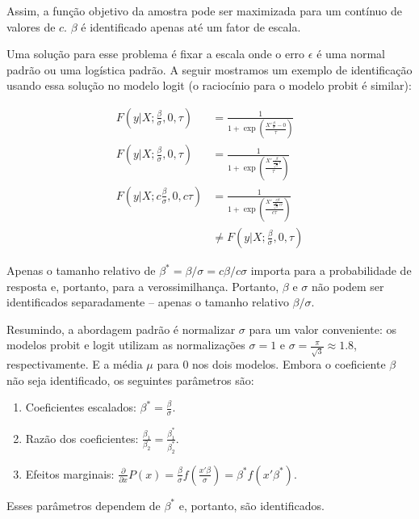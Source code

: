 \documentclass[12pt, a4paper, openany]{book}
\numberwithin{equation}{chapter}
\numberwithin{table}{chapter}
\numberwithin{figure}{chapter}
\theoremstyle{break}
\begin{document}
Assim, a função objetivo da amostra pode ser maximizada para um contínuo de valores de \( c \).
 \( \beta \) é identificado apenas até um fator de escala. 
 
 
Uma solução para esse problema é fixar a escala onde o erro $\epsilon$ é uma normal padrão ou uma logística padrão. A seguir mostramos um exemplo de identificação usando essa solução no modelo logit (o raciocínio para o modelo probit é similar):


\begin{align*}
    F(y | X; \frac{\beta}{\sigma},0,\tau )  &=  \frac{1}{1 + \exp\left( \frac{ X'\frac{\beta}{\sigma} - 0}{\tau} \right)} \\
    F(y | X; \frac{\beta}{\sigma},0,\tau )  &=  \frac{1}{1 + \exp\left( \frac{ X'\frac{\beta}{\frac{\pi}{\sqrt{3}}\tau}}{\tau} \right)} \\
    F(y | X; c \frac{\beta}{\sigma},0,c\tau ) & =  \frac{1}{1 + \exp\left( \frac{ X'\frac{c\beta}{\frac{\pi}{\sqrt{3}}c\tau}}{c\tau} \right)} \\
    & \neq F(y | X; \frac{\beta}{\sigma},0,\tau )
\end{align*}



Apenas o tamanho relativo de  $\beta^* = \beta / \sigma = c\beta / c\sigma$  importa para a probabilidade de resposta e, portanto, para a verossimilhança. Portanto, \( \beta \) e \( \sigma \) não podem ser identificados separadamente – apenas o tamanho relativo \( \beta / \sigma \). 



Resumindo, a abordagem padrão é normalizar $\sigma$ para um valor conveniente: os modelos probit e logit utilizam as normalizações $\sigma = 1$ e $\sigma = \frac{\pi}{\sqrt{3}} \approx 1.8$, respectivamente. E a média $\mu$ para 0 nos dois modelos. Embora o coeficiente $\beta$ não seja identificado, os seguintes parâmetros são:

\begin{enumerate}
    \item Coeficientes escalados: $\beta^* = \frac{\beta}{\sigma}$.
    \item Razão dos coeficientes: $\frac{\beta_1}{\beta_2} = \frac{\beta^*_1}{\beta^*_2}$.
    \item Efeitos marginais: $\frac{\partial}{\partial x} P(x) = \frac{\beta}{\sigma} f\left(\frac{x'\beta}{\sigma}\right) = \beta^* f\left(x'\beta^*\right)$.
\end{enumerate}

Esses parâmetros dependem de $\beta^*$ e, portanto, são identificados.
\end{document}
